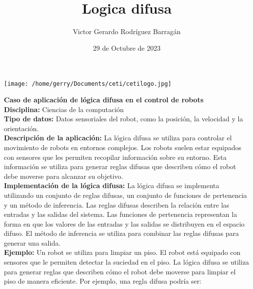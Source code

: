 \documentclass{article}
\title{Logica difusa}
\author{Victor Gerardo Rodríguez Barragán}
\date{29 de Octubre de 2023}
\begin{document}
\maketitle
\begin{center}
    \texttt{[image: /home/gerry/Documents/ceti/cetilogo.jpg]}
\end{center}

\newpage
\justify
\textbf{Caso de aplicación de lógica difusa en el control de robots}
\vspace{0.5cm}\\
\textbf{Disciplina:} Ciencias de la computación
\vspace{0.5cm}\\
\textbf{Tipo de datos:} Datos sensoriales del robot, como la posición, la velocidad y la orientación.
\vspace{0.5cm}\\
\textbf{Descripción de la aplicación:} La lógica difusa se utiliza para controlar el movimiento de robots en entornos complejos. Los robots suelen estar equipados con sensores que les permiten recopilar información sobre su entorno. Esta información se utiliza para generar reglas difusas que describen cómo el robot debe moverse para alcanzar su objetivo.
\vspace{0.5cm}\\
\textbf{Implementación de la lógica difusa:} La lógica difusa se implementa utilizando un conjunto de reglas difusas, un conjunto de funciones de pertenencia y un método de inferencia. Las reglas difusas describen la relación entre las entradas y las salidas del sistema. Las funciones de pertenencia representan la forma en que los valores de las entradas y las salidas se distribuyen en el espacio difuso. El método de inferencia se utiliza para combinar las reglas difusas para generar una salida.
\vspace{0.5cm}\\
\textbf{Ejemplo:} Un robot se utiliza para limpiar un piso. El robot está equipado con sensores que le permiten detectar la suciedad en el piso. La lógica difusa se utiliza para generar reglas que describen cómo el robot debe moverse para limpiar el piso de manera eficiente. Por ejemplo, una regla difusa podría ser:
\end{document}
